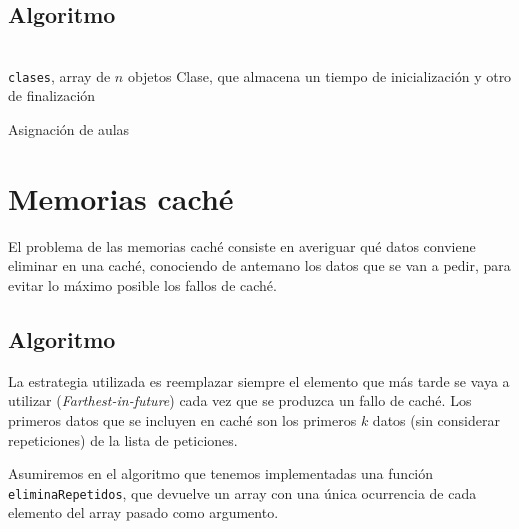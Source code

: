 \documentclass[a4paper, 11pt]{article} %
\let\emptyset\varnothing
\begin{document}
  \subsection{Algoritmo}
\begin{algorithm}[H]
	\begin{algorithmic}[1]
		\REQUIRE \ \\
        	\texttt{clases}, array de $n$ objetos Clase, que almacena
				 un tiempo de inicialización y otro de 
				 finalización\\
	  \WHILE{\texttt{sin\_colorear}$\neq \emptyset$}
	      \ENDIF
	    \ENDFOR
	    
	  \ENDWHILE
	\end{algorithmic}
    \caption{Asignación de aulas}
    \label{aulas}
\end{algorithm}


\section{Memorias caché}
\label{cache}
El problema de las memorias caché consiste en averiguar qué datos conviene eliminar en una caché, conociendo de antemano los datos que se van a pedir, para evitar lo máximo posible los fallos de caché.
  \subsection{Algoritmo}
La estrategia utilizada es reemplazar siempre el elemento que más tarde se vaya a utilizar (\textit{Farthest-in-future}) cada vez que se produzca un fallo de caché. Los primeros datos que se incluyen en caché son los primeros $k$ datos (sin considerar repeticiones) de la lista de peticiones.

Asumiremos en el algoritmo que tenemos implementadas una función \texttt{eliminaRepetidos}, que devuelve un array con una única ocurrencia de cada elemento del array pasado como argumento.
\end{document}
